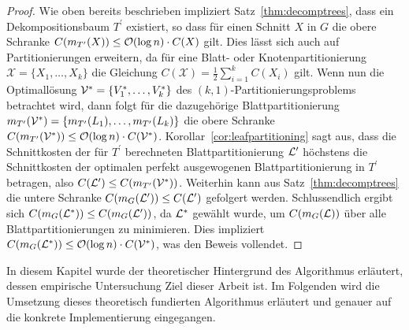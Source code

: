 \begin{proof}
    Wie oben bereits beschrieben impliziert Satz~\ref{thm:decomptrees}, dass ein Dekompositionsbaum $T^\prime$ existiert, so dass für einen Schnitt $X$ in $G$ die obere Schranke $C(m_{T^\prime}(X)) \leq \mathcal{O}(\log n) \cdot C(X)$ gilt.
    Dies lässt sich auch auf Partitionierungen erweitern, da für eine Blatt- oder Knotenpartitionierung $\mathcal{X} = \{X_1, \ldots, X_k\}$ die Gleichung $C(\mathcal{X}) = \frac{1}{2} \sum_{i=1}^k C(X_i)$ gilt.
    Wenn nun die Optimallösung $\mathcal{V}^* = \{ V_1^*, \ldots, V_k^* \}$ des $(k, 1)$\hyp Partitionierungsproblems betrachtet wird, dann folgt für die dazugehörige Blattpartitionierung $m_{T^\prime}(\mathcal{V}^*) = \{ m_{T^\prime}(L_1), \ldots, m_{T^\prime}(L_k) \}$ die obere Schranke $C(m_{T^\prime}(\mathcal{V}^*)) \leq \mathcal{O}(\log n) \cdot C(\mathcal{V}^*)$.
    Korollar~\ref{cor:leafpartitioning} sagt aus, dass die Schnittkosten der für $T^\prime$ berechneten Blattpartitionierung $\mathcal{L}^\prime$ höchstens die Schnittkosten der optimalen perfekt ausgewogenen Blattpartitionierung in $T^\prime$ betragen, also $C(\mathcal{L}^\prime) \leq C(m_{T^\prime}(\mathcal{V}^*))$.
    Weiterhin kann aus Satz~\ref{thm:decomptrees} die untere Schranke $C(m_G(\mathcal{L}^\prime)) \leq C(\mathcal{L}^\prime)$ gefolgert werden.
    Schlussendlich ergibt sich $C(m_G(\mathcal{L}^*)) \leq C(m_G(\mathcal{L}^\prime))$, da $\mathcal{L}^*$ gewählt wurde, um $C(m_G(\mathcal{L}))$ über alle Blattpartitionierungen zu minimieren.
    Dies impliziert $C(m_G(\mathcal{L}^*)) \leq \mathcal{O}(\log n) \cdot C(\mathcal{V}^*)$, was den Beweis vollendet.
\end{proof}

In diesem Kapitel wurde der theoretischer Hintergrund des Algorithmus erläutert, dessen empirische Untersuchung Ziel dieser Arbeit ist.  
Im Folgenden wird die Umsetzung dieses theoretisch fundierten Algorithmus erläutert und genauer auf die konkrete Implementierung eingegangen.

